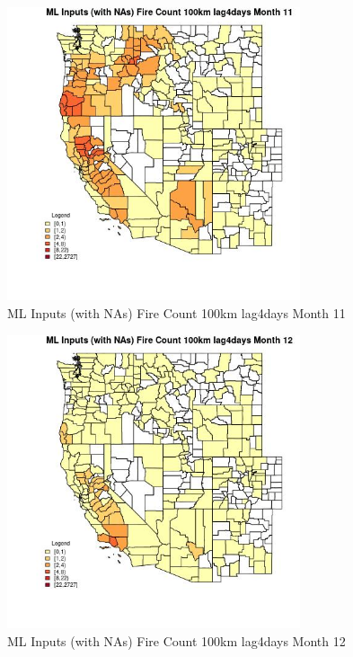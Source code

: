 \begin{figure} 
\centering  
\includegraphics[width=0.77\textwidth]{Code_Outputs/Report_ML_input_PM25_Step4_part_f_de_duplicated_aveswNAs_CountyFire_Count_100km_lag4daysmedianMonth11.jpg} 
\caption{\label{fig:Report_ML_input_PM25_Step4_part_f_de_duplicated_aveswNAsCountyFire_Count_100km_lag4daysmedianMonth11}ML Inputs (with NAs) Fire Count 100km lag4days Month 11} 
\end{figure} 
 

\begin{figure} 
\centering  
\includegraphics[width=0.77\textwidth]{Code_Outputs/Report_ML_input_PM25_Step4_part_f_de_duplicated_aveswNAs_CountyFire_Count_100km_lag4daysmedianMonth12.jpg} 
\caption{\label{fig:Report_ML_input_PM25_Step4_part_f_de_duplicated_aveswNAsCountyFire_Count_100km_lag4daysmedianMonth12}ML Inputs (with NAs) Fire Count 100km lag4days Month 12} 
\end{figure} 
 

